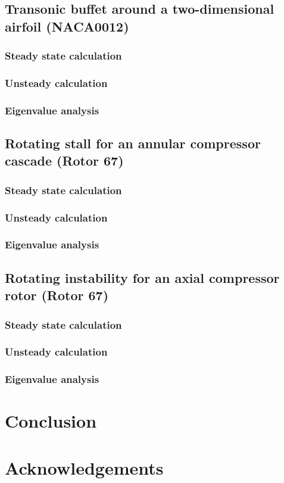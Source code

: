 \documentclass[journal,final]{new-aiaa}
\begin{document}
\subsection{Transonic buffet around a two-dimensional airfoil (NACA0012)}

\subsubsection{Steady state calculation}
\subsubsection{Unsteady calculation}
\subsubsection{Eigenvalue analysis}

\subsection{Rotating stall for an annular compressor cascade (Rotor 67)}

\subsubsection{Steady state calculation}
\subsubsection{Unsteady calculation}
\subsubsection{Eigenvalue analysis}

\subsection{Rotating instability for an axial compressor rotor (Rotor 67)}

\subsubsection{Steady state calculation}
\subsubsection{Unsteady calculation}
\subsubsection{Eigenvalue analysis}

\section{Conclusion}
\label{conclusion}

\section*{Acknowledgements}


\end{document}
